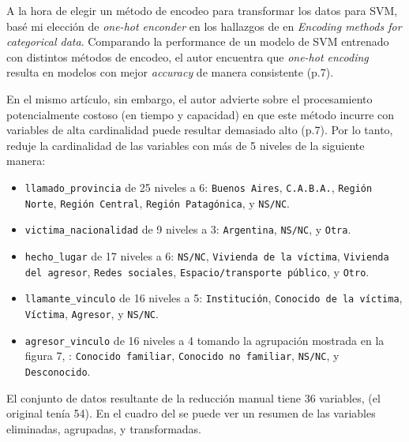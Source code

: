 \documentclass[10 pt]{article}
\begin{document}
A la hora de elegir un método de encodeo para transformar los datos para SVM, basé mi elección de \textit{one-hot enconder} en los hallazgos de \citet{udilua2023encoding} en \textit{Encoding methods for categorical data}. Comparando la performance de un modelo de SVM entrenado con distintos métodos de encodeo, el autor encuentra que \textit{one-hot encoding} resulta en modelos con mejor \textit{accuracy} de manera consistente (p.7). 

En el mismo artículo, sin embargo, el autor advierte sobre el procesamiento potencialmente costoso (en tiempo y capacidad) en que este método incurre con variables de alta cardinalidad puede resultar demasiado alto (p.7). Por lo tanto, reduje la cardinalidad de las variables con más de 5 niveles de la siguiente manera:

\begin{itemize}
    \item \texttt{llamado\_provincia} de 25 niveles a 6: \texttt{Buenos Aires}, \texttt{C.A.B.A.}, \texttt{Región Norte}, \texttt{Región Central}, \texttt{Región Patagónica}, y \texttt{NS/NC}. 
    \item \texttt{victima\_nacionalidad} de 9 niveles a 3: \texttt{Argentina}, \texttt{NS/NC}, y \texttt{Otra}. %
    \item \texttt{hecho\_lugar} de 17 niveles a 6: \texttt{NS/NC}, \texttt{Vivienda de la víctima}, \texttt{Vivienda del agresor}, \texttt{Redes sociales}, \texttt{Espacio/transporte público}, %
    y \texttt{Otro}. %
    \item \texttt{llamante\_vinculo} de 16 niveles a 5: \texttt{Institución}, %
\texttt{Conocido de la víctima}, %
\texttt{Víctima}, \texttt{Agresor}, y \texttt{NS/NC}.
\item \texttt{agresor\_vinculo} de 16 niveles a 4 tomando la agrupación mostrada en la figura 7, : \texttt{Conocido familiar}, \texttt{Conocido no familiar}, \texttt{NS/NC}, y \texttt{Desconocido}.
\end{itemize}


El conjunto de datos resultante de la reducción manual tiene 36 variables, (el original tenía 54). En el cuadro  del  se puede ver un resumen de las variables eliminadas, agrupadas, y transformadas.
\end{document}
